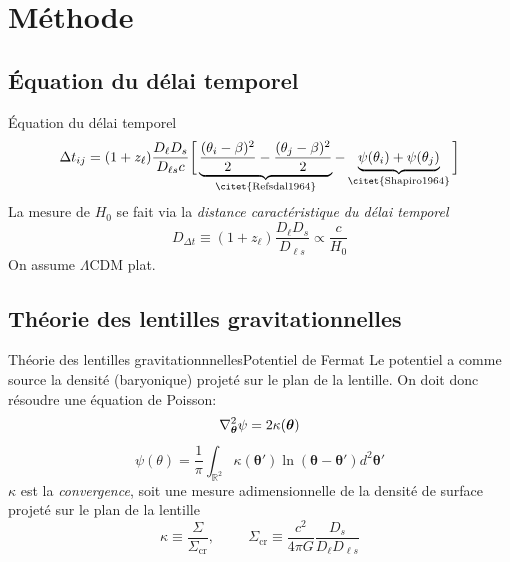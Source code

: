 \documentclass{beamer}
\begin{document}
\section{Méthode}
\subsection{Équation du délai temporel}
\begin{frame}{Équation du délai temporel}
	\begin{equation}\label{eq:DelaiTemp} 
            \Delta t_{ij} = (1 + z_{\ell})\frac{D_\ell D_s}{D_{\ell s}c}
            \bigg[ \underbrace{\frac{(\theta_i - \beta)^2}{2} -
            \frac{(\theta_j - \beta)^2}{2}}_{\text{\citet{Refsdal1964}}} 
            -\underbrace{\psi(\theta_i) + \psi(\theta_j)}_{\text{\citet{Shapiro1964}}}
    \bigg]
	\end{equation}
La mesure de $H_0$ se fait via la \textit{distance caractéristique du délai temporel}
\begin{equation}\label{eq:Ddl} 
        D_{\Delta t} \equiv (1 + z_\ell)\frac{D_\ell D_s}{D_{\ell s}} \propto \frac{c}{H_0} 
\end{equation} 
On assume $\Lambda$CDM plat.
\end{frame}

\subsection{Théorie des lentilles gravitationnelles}
\begin{frame}{Théorie des lentilles gravitationnnelles}{Potentiel de Fermat}
Le potentiel a comme source la densité (baryonique) projeté sur le plan de la lentille. On doit donc résoudre une équation de Poisson:
\begin{equation}\label{eq:Poisson} 
        \laplacian_{\boldsymbol{\theta}} \psi = 2 \kappa(\boldsymbol{\theta}) 
\end{equation} 
       \begin{equation}\label{eq:potentiel} 
               \psi(\theta) = \frac{1}{\pi}\int_{\mathbb{R}^2} \kappa(\boldsymbol{\theta}')
               \ln(\boldsymbol{\theta} - \boldsymbol{\theta}') d^2\boldsymbol{\theta}'
       \end{equation}  
$\kappa$ est la \textit{convergence}, soit une mesure adimensionnelle de la densité de 
surface projeté sur le plan de la lentille 
\begin{equation}\label{eq:Kappa} 
        \kappa \equiv \frac{\Sigma}{\Sigma_{\text{cr}}},\hspace{1cm}
       \Sigma_{\text{cr}} \equiv \frac{c^2}{4 \pi G} 
       \frac{D_s}{D_\ell D_{\ell s}}
\end{equation} 
\end{frame}
\end{document}
